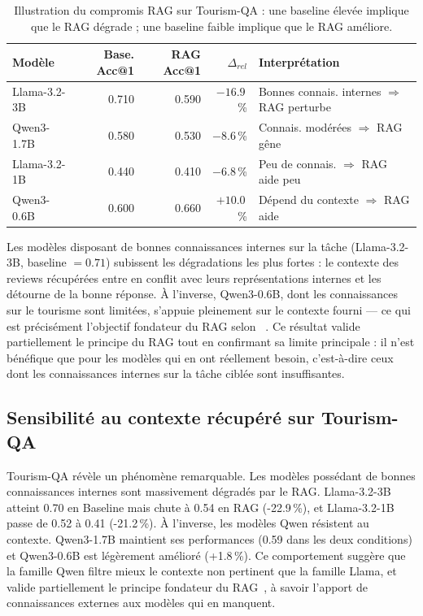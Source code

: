 \documentclass[12pt,a4paper]{article}
\begin{document}
\begin{table}[H]
\centering
\small
\caption{Illustration du compromis RAG sur Tourism-QA : une baseline élevée 
implique que le RAG dégrade ; une baseline faible implique que le RAG améliore.}
\label{tab:compromis_tourism}
\begin{tabular}{lrrrp{5.5cm}}
\toprule
\textbf{Modèle} & \textbf{Base. Acc@1} & \textbf{RAG Acc@1} & 
\textbf{$\Delta_{rel}$} & \textbf{Interprétation} \\
\midrule
Llama-3.2-3B & 0.710 & 0.590 & $-16.9$\,\% & 
    Bonnes connais. internes $\Rightarrow$ RAG perturbe \\
Qwen3-1.7B   & 0.580 & 0.530 & $-8.6$\,\%  & 
    Connais. modérées $\Rightarrow$ RAG gêne \\
Llama-3.2-1B & 0.440 & 0.410 & $-6.8$\,\%  & 
    Peu de connais. $\Rightarrow$ RAG aide peu \\
Qwen3-0.6B   & 0.600 & 0.660 & $+10.0$\,\% & 
    Dépend du contexte $\Rightarrow$ RAG aide \\
\bottomrule
\end{tabular}
\end{table}

Les modèles disposant de bonnes connaissances internes sur la tâche 
(Llama-3.2-3B, baseline $= 0.71$) subissent les dégradations les plus fortes : 
le contexte des reviews récupérées entre en conflit avec leurs représentations 
internes et les détourne de la bonne réponse. À l'inverse, Qwen3-0.6B, dont les 
connaissances sur le tourisme sont limitées, s'appuie pleinement sur le contexte 
fourni --- ce qui est précisément l'objectif fondateur du RAG selon ~\cite{lewis2020retrieval}. Ce résultat valide partiellement le principe du RAG tout en 
confirmant sa limite principale : il n'est bénéfique que pour les modèles qui en 
ont réellement besoin, c'est-à-dire ceux dont les connaissances internes sur la 
tâche ciblée sont insuffisantes.

\subsection{Sensibilit\'e au contexte r\'ecup\'er\'e sur Tourism-QA}

Tourism-QA r\'ev\`ele un ph\'enom\`ene remarquable. Les mod\`eles poss\'edant de bonnes connaissances internes sont massivement d\'egrad\'es par le RAG. Llama-3.2-3B atteint 0.70 en Baseline mais chute \`a 0.54 en RAG (-22.9\,\%), et Llama-3.2-1B passe de 0.52 \`a 0.41 (-21.2\,\%). \`A l'inverse, les mod\`eles Qwen r\'esistent au contexte. Qwen3-1.7B maintient ses performances (0.59 dans les deux conditions) et Qwen3-0.6B est l\'eg\`erement am\'elior\'e (+1.8\,\%). Ce comportement sugg\`ere que la famille Qwen filtre mieux le contexte non pertinent que la famille Llama, et valide partiellement le principe fondateur du RAG~\cite{lewis2020retrieval}, \`a savoir l'apport de connaissances externes aux mod\`eles qui en manquent.
\end{document}
